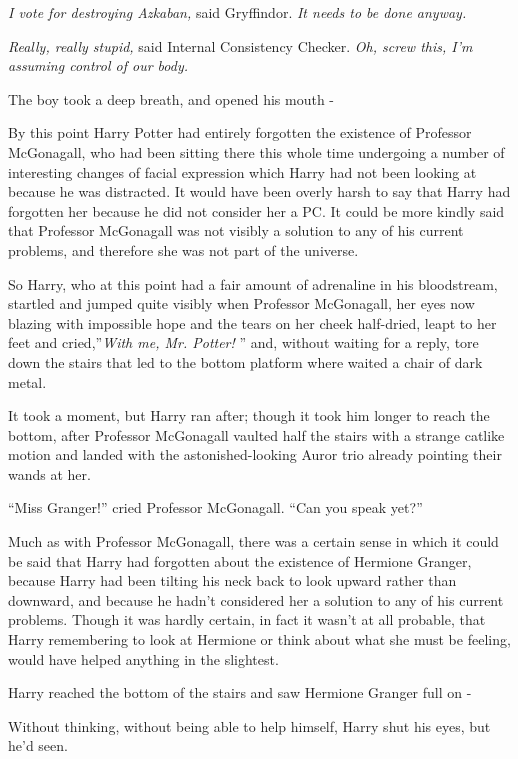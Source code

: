 \emph{I vote for destroying Azkaban,} said Gryffindor. \emph{It needs to
be done anyway.}

\emph{Really, really stupid,} said Internal Consistency Checker.
\emph{Oh, screw this, I'm assuming control of our body.}

The boy took a deep breath, and opened his mouth -

By this point Harry Potter had entirely forgotten the existence of
Professor McGonagall, who had been sitting there this whole time
undergoing a number of interesting changes of facial expression which
Harry had not been looking at because he was distracted. It would have
been overly harsh to say that Harry had forgotten her because he did not
consider her a PC. It could be more kindly said that Professor
McGonagall was not visibly a solution to any of his current problems,
and therefore she was not part of the universe.

So Harry, who at this point had a fair amount of adrenaline in his
bloodstream, startled and jumped quite visibly when Professor
McGonagall, her eyes now blazing with impossible hope and the tears on
her cheek half-dried, leapt to her feet and cried,''\emph{With me, Mr.
Potter!} '' and, without waiting for a reply, tore down the stairs that
led to the bottom platform where waited a chair of dark metal.

It took a moment, but Harry ran after; though it took him longer to
reach the bottom, after Professor McGonagall vaulted half the stairs
with a strange catlike motion and landed with the astonished-looking
Auror trio already pointing their wands at her.

``Miss Granger!'' cried Professor McGonagall. ``Can you speak yet?''

Much as with Professor McGonagall, there was a certain sense in which it
could be said that Harry had forgotten about the existence of Hermione
Granger, because Harry had been tilting his neck back to look upward
rather than downward, and because he hadn't considered her a solution to
any of his current problems. Though it was hardly certain, in fact it
wasn't at all probable, that Harry remembering to look at Hermione or
think about what she must be feeling, would have helped anything in the
slightest.

Harry reached the bottom of the stairs and saw Hermione Granger full on
-

Without thinking, without being able to help himself, Harry shut his
eyes, but he'd seen.

